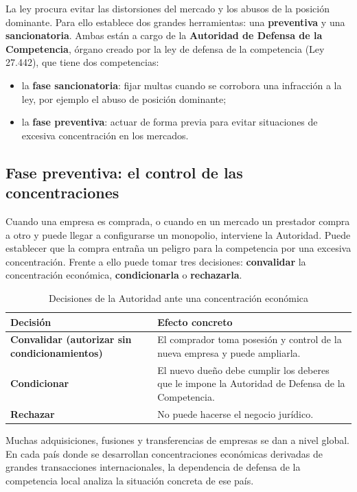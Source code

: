 \documentclass[12pt,oneside]{book}
\begin{document}
La ley procura evitar las distorsiones del mercado y los abusos de la posición dominante. Para ello establece dos grandes herramientas: una \textbf{preventiva} y una \textbf{sancionatoria}. Ambas están a cargo de la \textbf{Autoridad de Defensa de la Competencia}, órgano creado por la ley de defensa de la competencia (Ley 27.442), que tiene dos competencias:
\begin{itemize}
    \item la \textbf{fase sancionatoria}: fijar multas cuando se corrobora una infracción a la ley, por ejemplo el abuso de posición dominante;
    \item la \textbf{fase preventiva}: actuar de forma previa para evitar situaciones de excesiva concentración en los mercados.
\end{itemize}

\subsection{Fase preventiva: el control de las concentraciones}

Cuando una empresa es comprada, o cuando en un mercado un prestador compra a otro y puede llegar a configurarse un monopolio, interviene la Autoridad. Puede establecer que la compra entraña un peligro para la competencia por una excesiva concentración. Frente a ello puede tomar tres decisiones: \textbf{convalidar} la concentración económica, \textbf{condicionarla} o \textbf{rechazarla}.

\begin{table}[H]
\centering
\small
\caption{Decisiones de la Autoridad ante una concentración económica}
\begin{tabularx}{\textwidth}{>{\raggedright\arraybackslash\bfseries}p{4.2cm} >{\raggedright\arraybackslash}X}
\toprule
Decisión & Efecto concreto \\
\midrule
Convalidar (autorizar sin condicionamientos) & El comprador toma posesión y control de la nueva empresa y puede ampliarla. \\
Condicionar & El nuevo dueño debe cumplir los deberes que le impone la Autoridad de Defensa de la Competencia. \\
Rechazar & No puede hacerse el negocio jurídico. \\
\bottomrule
\end{tabularx}
\end{table}

Muchas adquisiciones, fusiones y transferencias de empresas se dan a nivel global. En cada país donde se desarrollan concentraciones económicas derivadas de grandes transacciones internacionales, la dependencia de defensa de la competencia local analiza la situación concreta de ese país.
\end{document}
